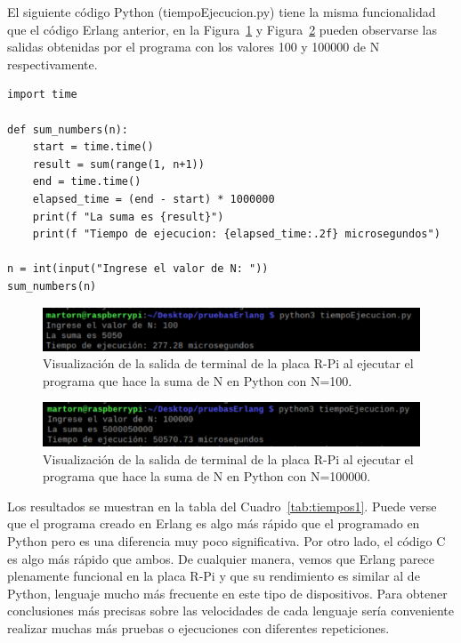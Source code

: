 \clearpage
El siguiente código Python (tiempoEjecucion.py) tiene la misma funcionalidad que el código Erlang anterior, en la Figura~\ref{fig:pruebaPython} y Figura~\ref{fig:pruebaPython100000} pueden observarse las salidas obtenidas por el programa con los valores 100 y 100000 de N respectivamente.


\lstset{language=Python, breaklines=true, basicstyle=\footnotesize}
\begin{lstlisting}[frame=single, caption=tiempoEjecucion.py]
import time

def sum_numbers(n):
    start = time.time()
    result = sum(range(1, n+1))
    end = time.time()
    elapsed_time = (end - start) * 1000000
    print(f "La suma es {result}")
    print(f "Tiempo de ejecucion: {elapsed_time:.2f} microsegundos")

n = int(input("Ingrese el valor de N: "))
sum_numbers(n)
\end{lstlisting}

\begin{figure}[h]
\centering
\includegraphics[scale=1.3]{images/pruebaPython100.png}
\caption[Salida de terminal suma de N=100 con Python]{Visualización de la salida de terminal de la placa R-Pi al ejecutar el programa que hace la suma de N en Python con N=100.}%
\label{fig:pruebaPython}
\end{figure}

\begin{figure}[h]
\centering
\includegraphics[scale=1.3]{images/pruebaPython.png}
\caption[Salida de terminal suma de N=100000 con Erlang]{Visualización de la salida de terminal de la placa R-Pi al ejecutar el programa que hace la suma de N en Python con N=100000.}%
\label{fig:pruebaPython100000}
\end{figure}

Los resultados se muestran en la tabla del Cuadro~\ref{tab:tiempos1}. Puede verse que el programa creado en Erlang es algo más rápido que el programado en Python pero es una diferencia muy poco significativa. Por otro lado, el código C es algo más rápido que ambos. De cualquier manera, vemos que Erlang parece plenamente funcional en la placa R-Pi y que su rendimiento es similar al de Python, lenguaje mucho más frecuente en este tipo de dispositivos. Para obtener conclusiones más precisas sobre las velocidades de cada lenguaje sería conveniente realizar muchas más pruebas o ejecuciones con diferentes repeticiones. 

